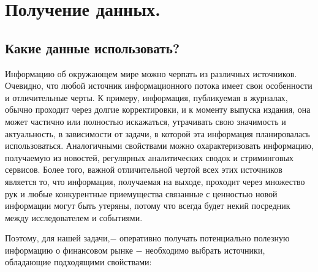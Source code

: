 \documentclass{article}
\begin{document}
\section{Получение данных.}
\label{sec:headings}



\subsection*{Какие данные использовать?}

Информацию об окружающем мире можно черпать из различных источников. Очевидно, что любой источник информационного потока имеет свои особенности и отличительные черты. К примеру, информация, публикуемая в журналах, обычно проходит через долгие корректировки, и к моменту выпуска издания, она может частично или полностью искажаться, утрачивать свою значимость и актуальность, в зависимости от задачи, в которой эта информация планировалась использоваться. Аналогичными свойствами можно охарактеризовать информацию, получаемую из новостей, регулярных аналитических сводок и стриминговых сервисов. Более того, важной отличительной чертой всех этих источников является то, что информация, получаемая на выходе, проходит через множество рук и любые конкурентные приемущества связанные с ценностью новой информации могут быть утеряны, потому что всегда будет некий посредник между исследователем и событиями.  
\par Поэтому, для нашей задачи,$-$ оперативно получать потенциально полезную информацию о финансовом рынке $-$ необходимо выбрать источники, обладающие подходящими свойствами:
\end{document}
